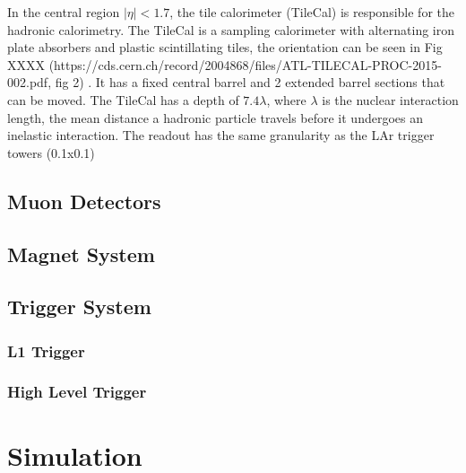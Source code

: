 \indent In the central region ${|\eta{}|<1.7}$, the tile calorimeter (TileCal) is responsible for the hadronic calorimetry. The TileCal is a sampling calorimeter with alternating iron plate absorbers and plastic scintillating tiles, the orientation can be seen in Fig XXXX (https://cds.cern.ch/record/2004868/files/ATL-TILECAL-PROC-2015-002.pdf, fig 2) . It has a fixed central barrel and 2 extended barrel sections that can be moved. The TileCal has a depth of ${7.4\lambda{}}$, where ${\lambda{}}$ is the nuclear interaction length, the mean distance a hadronic particle travels before it undergoes an inelastic interaction. The readout has the same granularity as the LAr trigger towers (0.1x0.1)
\subsection{Muon Detectors}
\subsection{Magnet System}\label{ssec:mag}
\subsection{Trigger System}
\subsubsection{L1 Trigger}
\subsubsection{High Level Trigger}
\section{Simulation}




